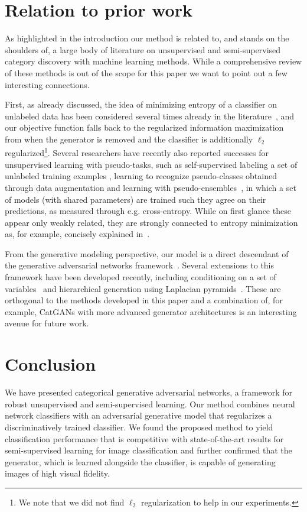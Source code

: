 \documentclass{article} \usepackage{iclr2016_conference,times}
\begin{document}
\section{Relation to prior work}
\label{sect:prior_work}
As highlighted in the introduction our method is related to, and
stands on the shoulders of, a large body of literature on unsupervised
and semi-supervised category discovery with machine learning
methods. While a comprehensive review of these methods is out of the
scope for this paper we want to point out a few interesting connections. 

First, as already discussed, the idea of minimizing entropy of a
classifier on unlabeled data has been considered several times already
in the literature~\citep{Bridle_91,Grandvalet_2004,Krause_2010}, and
our objective function falls back to the regularized information
maximization from \citet{Krause_2010} when the generator is removed
and the classifier is additionally $\ell_2$ regularized\footnote{We
  note that we did not find $\ell_2$ regularization to help in our
  experiments.}. Several researchers have recently also reported
successes for unsupervised learning with pseudo-tasks, such as
self-supervised labeling a set of unlabeled training examples
\citep{Lee_ICML_WCLR2013}, learning to recognize pseudo-classes obtained through
data augmentation \citep{Dosovits_NIPS2014} and learning with
pseudo-ensembles~\citep{Bachman_NIPS2014}, in which a set of models
(with shared parameters) are trained such they agree on their
predictions, as measured through e.g. cross-entropy. While on first
glance these appear only weakly related, they are strongly connected to
entropy minimization as, for example, concisely explained in~\citet{Bachman_NIPS2014}.  

From the generative modeling perspective, our model is a direct
descendant of the generative adversarial networks
framework~\citep{Goodfellow_NIPS2014}. Several extensions to this
framework have been developed recently, including conditioning on a
set of variables~\citep{Gauthier_2014,Mirza_2014} and hierarchical generation using
Laplacian pyramids~\citep{Denton_NIPS2015}. These are orthogonal to
the methods developed in this paper and a combination of, for example,
CatGANs with more advanced generator architectures is an interesting
avenue for future work.

\section{Conclusion}
We have presented categorical generative adversarial networks, a framework for robust unsupervised and semi-supervised learning. Our method combines neural network classifiers with an adversarial generative model that regularizes a discriminatively trained classifier. We found the proposed method to yield classification performance that is competitive with state-of-the-art results for semi-supervised learning for image classification and further confirmed that the generator, which is learned alongside the classifier, is capable of generating images of high visual fidelity.
\end{document}
